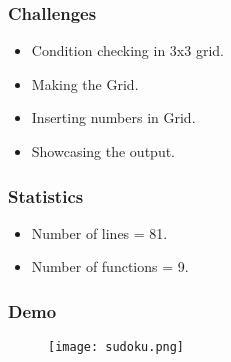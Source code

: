\documentclass[14pt]{beamer}
\begin{document}
\begin{frame}
  \frametitle{Challenges}
    \begin{itemize}
        \item Condition checking in 3x3 grid.
        \item Making the Grid.
        \item Inserting numbers in Grid.
        \item Showcasing the output.
    \end{itemize}
\end{frame}
\begin{frame}
  \frametitle{Statistics}
  \begin{itemize}
      \item Number of lines = 81.
      \item Number of functions = 9.
   \end{itemize}
\end{frame}
\begin{frame}
	\frametitle{Demo}
	 \begin{figure}
       	\texttt{[image: sudoku.png]}
   \end{figure}
    \end{frame}

 
\end{document}
